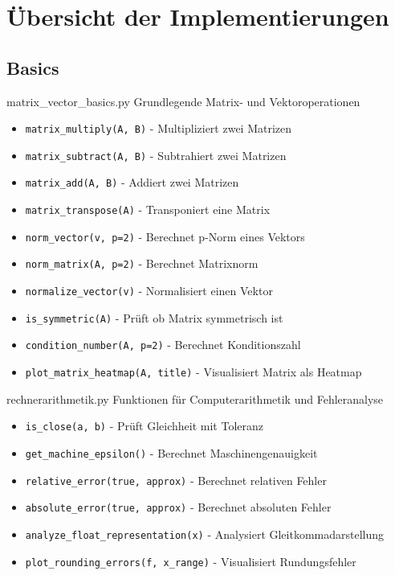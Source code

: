 \section{Übersicht der Implementierungen}

\subsection{Basics}

\begin{KR}{matrix\_vector\_basics.py}
    Grundlegende Matrix- und Vektoroperationen
    \begin{itemize}
        \item \texttt{matrix\_multiply(A, B)} - Multipliziert zwei Matrizen
        \item \texttt{matrix\_subtract(A, B)} - Subtrahiert zwei Matrizen
        \item \texttt{matrix\_add(A, B)} - Addiert zwei Matrizen
        \item \texttt{matrix\_transpose(A)} - Transponiert eine Matrix
        \item \texttt{norm\_vector(v, p=2)} - Berechnet p-Norm eines Vektors
        \item \texttt{norm\_matrix(A, p=2)} - Berechnet Matrixnorm
        \item \texttt{normalize\_vector(v)} - Normalisiert einen Vektor
        \item \texttt{is\_symmetric(A)} - Prüft ob Matrix symmetrisch ist
        \item \texttt{condition\_number(A, p=2)} - Berechnet Konditionszahl
        \item \texttt{plot\_matrix\_heatmap(A, title)} - Visualisiert Matrix als Heatmap
    \end{itemize}
\end{KR}

\begin{KR}{rechnerarithmetik.py}
    Funktionen für Computerarithmetik und Fehleranalyse
    \begin{itemize}
        \item \texttt{is\_close(a, b)} - Prüft Gleichheit mit Toleranz
        \item \texttt{get\_machine\_epsilon()} - Berechnet Maschinengenauigkeit
        \item \texttt{relative\_error(true, approx)} - Berechnet relativen Fehler
        \item \texttt{absolute\_error(true, approx)} - Berechnet absoluten Fehler
        \item \texttt{analyze\_float\_representation(x)} - Analysiert Gleitkommadarstellung
        \item \texttt{plot\_rounding\_errors(f, x\_range)} - Visualisiert Rundungsfehler
    \end{itemize}
\end{KR}

